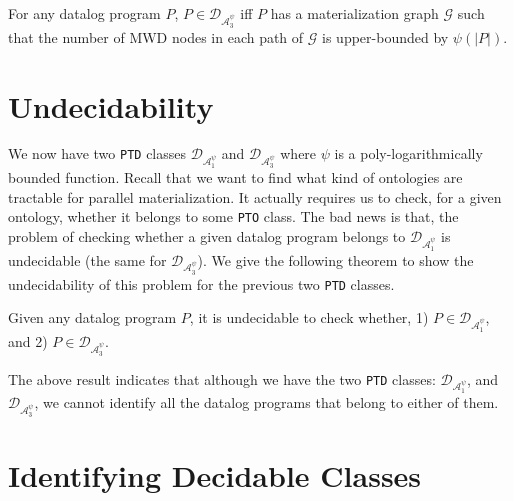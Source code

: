 \documentclass{article}
\begin{document}
\begin{theorem}
For any datalog program $P$, $P\in\mathcal{D}_{\mathcal{A}_3^{\psi}}$ iff $P$ has a materialization graph $\mathcal{G}$ such that the number of MWD nodes in each path of $\mathcal{G}$ is upper-bounded by $\psi(|P|)$.
\end{theorem}

\section{Undecidability}

We now have two \texttt{PTD} classes $\mathcal{D}_{\mathcal{A}_1^{\psi}}$ and $\mathcal{D}_{\mathcal{A}_3^{\psi}}$
where $\psi$ is a poly-logarithmically bounded function. Recall that we want to find what kind of ontologies are tractable for parallel materialization. It actually requires us to check, for a given ontology, whether it belongs to some \texttt{PTO} class. The bad news is that, the problem of checking whether a given datalog program belongs to $\mathcal{D}_{\mathcal{A}_1^{\psi}}$ is undecidable (the same for $\mathcal{D}_{\mathcal{A}_3^{\psi}}$). We give the following theorem to show the undecidability of this problem for the previous two \texttt{PTD} classes.

\begin{theorem} Given any datalog program $P$, it is undecidable to check whether, 1) $P\in\mathcal{D}_{\mathcal{A}_1^{\psi}}$, and 2) $P\in\mathcal{D}_{\mathcal{A}_3^{\psi}}$.
\end{theorem}

The above result indicates that although we have the two \texttt{PTD} classes: $\mathcal{D}_{\mathcal{A}_1^{\psi}}$, and $\mathcal{D}_{\mathcal{A}_3^{\psi}}$, we cannot identify all the datalog
programs that belong to either of them.


\section{Identifying Decidable Classes}
\end{document}
